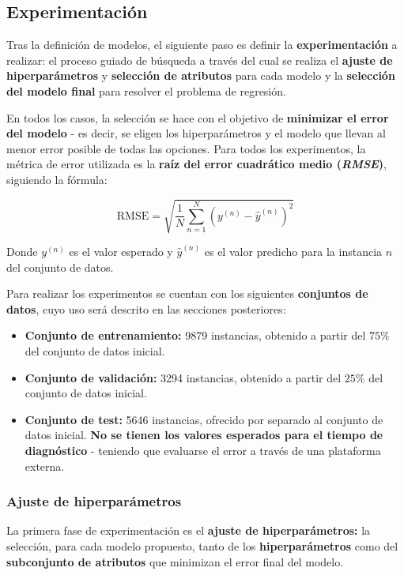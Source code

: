 \subsection{Experimentación}

Tras la definición de modelos, el siguiente paso es definir la \textbf{experimentación} a realizar: el proceso guiado de búsqueda a través del cual se realiza el \textbf{ajuste de hiperparámetros} y \textbf{selección de atributos} para cada modelo y la \textbf{selección del modelo final} para resolver el problema de regresión.

En todos los casos, la selección se hace con el objetivo de \textbf{minimizar el error del modelo} - es decir, se eligen los hiperparámetros y el modelo que llevan al menor error posible de todas las opciones. Para todos los experimentos, la métrica de error utilizada es la \textbf{raíz del error cuadrático medio (\textit{RMSE})}, siguiendo la fórmula:

$$\text{RMSE} = \sqrt{\frac{1}{N} \sum_{n=1}^{N}\left( y^{(n)} - \hat{y}^{(n)}\right)^2}$$

Donde $y^{(n)}$ es el valor esperado y $\hat{y}^{(n)}$ es el valor predicho para la instancia $n$ del conjunto de datos.

Para realizar los experimentos se cuentan con los siguientes \textbf{conjuntos de datos}, cuyo uso será descrito en las secciones posteriores:
\begin{itemize}[parsep=1pt, itemsep=1pt, topsep=4pt]
	\item \textbf{Conjunto de entrenamiento:} 9879 instancias, obtenido a partir del $75\%$ del conjunto de datos inicial.
	\item \textbf{Conjunto de validación:} 3294 instancias, obtenido a partir del $25\%$ del conjunto de datos inicial.
	\item \textbf{Conjunto de test:} 5646 instancias, ofrecido por separado al conjunto de datos inicial. \textbf{No se tienen los valores esperados para el tiempo de diagnóstico} - teniendo que evaluarse el error a través de una plataforma externa.
\end{itemize}

\subsubsection{Ajuste de hiperparámetros}

La primera fase de experimentación es el \textbf{ajuste de hiperparámetros:} la selección, para cada modelo propuesto, tanto de los \textbf{hiperparámetros} como del \textbf{subconjunto de atributos} que minimizan el error final del modelo. 

